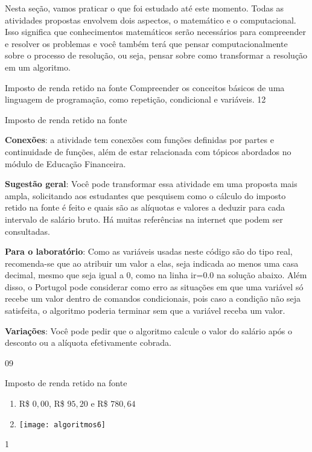 \clearpage
\practice{}
\label{comp-prac1}

Nesta seção, vamos praticar o que foi estudado até este momento. Todas as atividades propostas envolvem dois aspectos, o matemático e o computacional. Isso significa que conhecimentos matemáticos serão necessários para compreender e resolver os problemas e você também terá que pensar computacionalmente sobre o processo de resolução, ou seja, pensar sobre como transformar a resolução em um algoritmo.

\begin{objectives}{Imposto de renda retido na fonte}
{
Compreender os conceitos básicos de uma linguagem de programação, como repetição, condicional e variáveis.
}{1}{2}
\end{objectives}

\begin{sugestions}{Imposto de renda retido na fonte}
{
\textbf{Conexões}: a atividade tem conexões com funções definidas por partes e continuidade de funções, além de estar relacionada com tópicos abordados no módulo de Educação Financeira.

\textbf{Sugestão geral}: Você pode transformar essa atividade em uma proposta mais ampla, solicitando aos estudantes que pesquisem como o cálculo do imposto retido na fonte é feito e quais são as alíquotas e valores a deduzir para cada intervalo de salário bruto. Há muitas referências na internet que podem ser consultadas.

\textbf{Para o laboratório}: Como as variáveis usadas neste código são do tipo real, recomenda-se que ao atribuir um valor a elas, seja indicada ao menos uma casa decimal, mesmo que seja igual a 0, como na linha ir=0.0 na solução abaixo. Além disso, o Portugol pode considerar como erro as situações em que uma variável só recebe um valor dentro de comandos condicionais, pois caso a condição não seja satisfeita, o algoritmo poderia terminar sem que a variável receba um valor.

\textbf{Variações}: Você pode pedir que o algoritmo calcule o valor do salário após o desconto ou a alíquota efetivamente cobrada.
}{0}{9}
\end{sugestions}
\begin{answer}{Imposto de renda retido na fonte}
{
\begin{enumerate}
\item R\$ $0{,}00$, R\$ $95{,}20$ e R\$ $780{,}64$
\item {}
{
\texttt{[image: algoritmos6]}
}
\end{enumerate}
}{1}
\end{answer}
